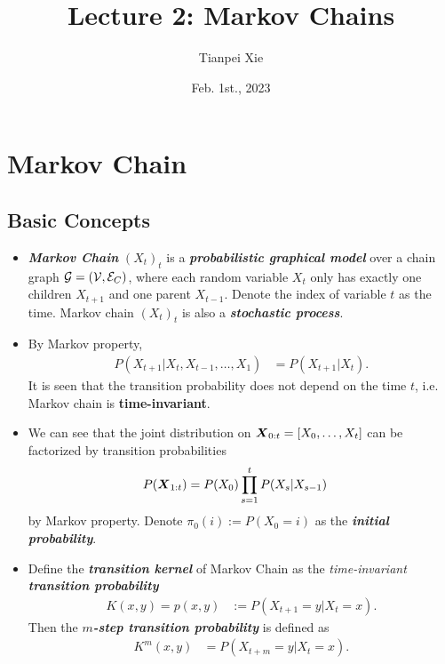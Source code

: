 \documentclass[11pt]{article}
\begin{document}
\title{Lecture 2: Markov Chains}
\author{ Tianpei Xie}
\date{ Feb. 1st., 2023 }
\maketitle
\tableofcontents
\newpage
\section{Markov Chain}
\subsection{Basic Concepts}
\begin{itemize}
\item \emph{\textbf{Markov Chain}} $(X_t)_t$ is a \emph{\textbf{probabilistic graphical model}} over a chain graph ${\mathcal G}=({\mathcal V}, {\mathcal E}_{C})$, where each random variable $X_t$ only has exactly one children $X_{t+1}$ and one parent $X_{t-1}$. Denote the index of variable $t$ as the time. Markov chain  $(X_t)_t$ is also a \emph{\textbf{stochastic process}}. 

\item By Markov property, 
\begin{align*}
P(X_{t+1} | X_t, X_{t-1}, \ldots, X_1) &= P(X_{t+1} | X_t) .
\end{align*} It is seen that the transition probability does not depend on the time $t$, i.e. Markov chain is \textbf{time-invariant}.

\item We can see that the joint distribution on $\boldsymbol{X}_{0:t} = [X_0, \ldots, X_t]$ can be factorized by transition probabilities
\begin{align*}
P(\boldsymbol{X}_{1:t} ) &= P(X_0)\prod_{s=1}^{t}P(X_s| X_{s-1})
\end{align*} by Markov property. Denote $\pi_{0}(i) := P(X_0 = i)$ as the \emph{\textbf{initial probability}}.


\item Define the \emph{\textbf{transition kernel}} of Markov Chain as the \emph{time-invariant} \emph{\textbf{transition probability}}
\begin{align}
K(x, y)  = p(x, y) &:= P(X_{t+1} = y | X_t = x).  \label{eqn: mc_kernel}
\end{align} Then the \emph{\textbf{$m$-step transition probability}} is defined as
\begin{align}
K^{m}(x, y) &= P(X_{t+m} = y | X_t = x). \label{eqn: mc_kernel_m}
\end{align}


\end{itemize}
\end{document}
